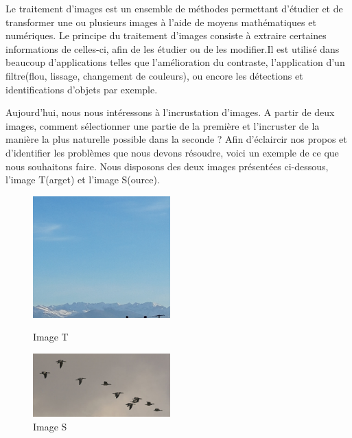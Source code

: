 
Le traitement d'images est un ensemble de méthodes permettant d'étudier et de transformer une ou plusieurs images à l'aide de moyens mathématiques et numériques. Le principe du traitement d'images consiste à extraire certaines informations de celles-ci, afin de les étudier ou de les modifier.Il est utilisé dans beaucoup d'applications telles que l'amélioration du contraste, l'application d'un filtre(flou, lissage, changement de couleurs), ou encore les détections et identifications d'objets par exemple. 

Aujourd'hui, nous nous intéressons à l'incrustation d'images. A partir de deux images, comment sélectionner une partie de la première et l'incruster de la manière la plus naturelle possible dans la seconde ? 
\newline
Afin d'éclaircir nos propos et d'identifier les problèmes que nous devons résoudre, voici un exemple de ce que nous souhaitons faire.\newline
Nous disposons des deux images présentées ci-dessous, l'image T(arget) et l'image S(ource). 
\newline
\begin{figure}[!htb]
   \begin{minipage}{0.48\textwidth}
     \centering
     \includegraphics[width = 150pt]{Images/Montagne.jpg}
     \caption{Image T}
      \end{minipage}\hfill
   \begin{minipage}{0.48\textwidth}
     \centering
     \includegraphics[width= 150pt]{Images/Oiseau.jpg}
     \caption{Image S}\label{Fig:Data2}
   \end{minipage}
\end{figure}

